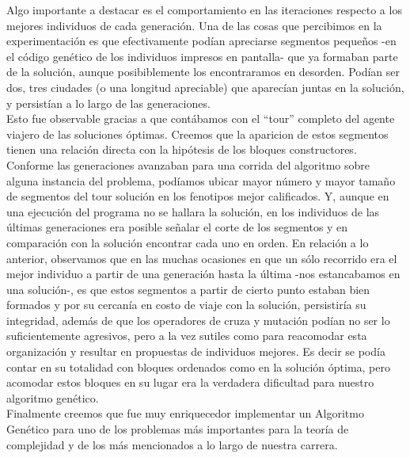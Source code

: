 \documentclass[12pt]{article}
\begin{document}
Algo importante a destacar es el comportamiento en las iteraciones
respecto a los mejores individuos de cada generación. Una de las cosas que
percibimos en la experimentación es que efectivamente podían apreciarse
segmentos pequeños -en el código genético de los individuos impresos en pantalla-
que ya formaban parte de la solución, aunque posibiblemente los encontraramos
en desorden. Podían ser dos, tres ciudades (o una longitud apreciable) que
aparecían juntas en la solución,
y persistían a lo largo de las generaciones. \\

Esto fue observable gracias a que contábamos con el ``tour'' completo del
agente viajero de las soluciones óptimas. Creemos
que la aparicion de estos segmentos tienen una relación directa con la hipótesis
de los bloques constructores. Conforme las generaciones avanzaban para una
corrida del algoritmo sobre alguna instancia del problema, podíamos ubicar
mayor número y mayor tamaño de segmentos del tour solución en los fenotipos
mejor calificados. Y, aunque en una ejecución del programa no se hallara la solución,
en los individuos de las últimas generaciones era posible señalar el corte de
los segmentos y en comparación con la solución encontrar cada uno en orden.
En relación a lo anterior, observamos que en las muchas ocasiones en que
un sólo recorrido era el mejor individuo a partir de una generación hasta la última
-nos estancabamos en una solución-,
es que estos segmentos a partir de cierto punto estaban bien formados y por su cercanía
en costo de viaje con la solución, persistiría su integridad, además de que
los operadores de cruza y mutación podían no ser lo suficientemente agresivos,
pero a la vez sutiles como
para reacomodar esta organización y resultar en propuestas de individuos mejores.
Es decir se podía contar en su totalidad con bloques ordenados como en la solución
óptima, pero acomodar estos bloques en su lugar era la verdadera dificultad para nuestro
algoritmo genético. \\

Finalmente creemos que fue muy enriquecedor implementar un Algoritmo Genético para
uno de los problemas más importantes para la teoría de complejidad y de los más
mencionados a lo largo de nuestra carrera.
\end{document}
